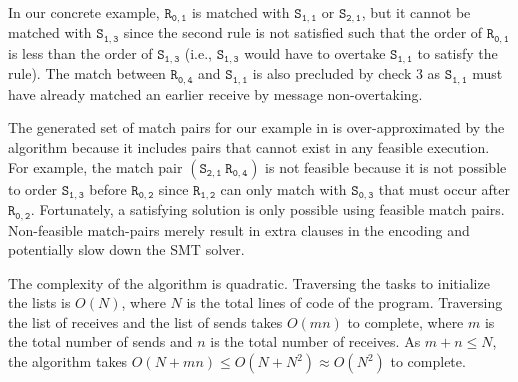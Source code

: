 In our concrete example, $\mathtt{R_{0,1}}$ is matched with
$\mathtt{S_{1,1}}$ or $\mathtt{S_{2,1}}$, but it cannot be matched
with $\mathtt{S_{1,3}}$ since the second rule is not satisfied such
that the order of $\mathtt{R_{0,1}}$ is less than the order of
$\mathtt{S_{1,3}}$ (i.e., $\mathtt{S_{1,3}}$ would have to overtake
$\mathtt{S_{1,1}}$ to satisfy the rule). The match between
$\mathtt{R_{0,4}}$ and $\mathtt{S_{1,1}}$ is also precluded by check 3
as $\mathtt{S_{1,1}}$ must have already matched an earlier receive by
message non-overtaking.

The generated set of match pairs for our example
in  is over-approximated by the algorithm because
it includes pairs that cannot exist in any feasible execution. For
example, the match pair $(\mathtt{S_{2,1}}\ \mathtt{R_{0,4}})$ is not
feasible because it is not possible to order $\mathtt{S_{1,3}}$ before
$\mathtt{R_{0,2}}$ since $\mathtt{R_{1,2}}$ can only match with
$\mathtt{S_{0,3}}$ that must occur after
$\mathtt{R_{0,2}}$. Fortunately, a satisfying solution is only
possible using feasible match pairs. Non-feasible match-pairs
merely result in extra clauses in the encoding and potentially slow
down the SMT solver.

The complexity of the algorithm is quadratic. Traversing
the tasks to initialize the lists is $O(N)$, where $N$ is the total
lines of code of the program. Traversing the list of receives and the
list of sends takes $O(mn)$ to complete, where $m$ is the total number
of sends and $n$ is the total number of receives. As $m + n \le N$,
the algorithm takes $O(N + mn) \leq O(N + N^2) \approx O(N^2)$ to
complete.

